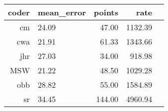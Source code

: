 \begin{table}[ht]
\centering
\begin{tabular}{rlrrr}
  \hline
 coder & mean\_error & points & rate \\ 
  \hline
cm & 24.09 & 47.00 & 1132.39 \\ 
cwa & 21.91 & 61.33 & 1343.66 \\ 
jhr & 27.03 & 34.00 & 918.98 \\ 
MSW & 21.22 & 48.50 & 1029.28 \\ 
obb & 28.82 & 55.00 & 1584.89 \\ 
sr & 34.45 & 144.00 & 4960.94 \\ 
   \hline
\end{tabular}
\end{table}
